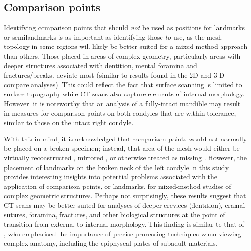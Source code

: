 \documentclass[review]{elsarticle}
\begin{document}
\subsection{Comparison points}

Identifying comparison points that should \textit{not} be used as positions for landmarks or semilandmarks is as important as identifying those \textit{to} use, as the mesh topology in some regions will likely be better suited for a mixed-method approach than others. Those placed in areas of complex geometry, particularly areas with deeper structures associated with dentition, mental foramina and fractures/breaks, deviate most (similar to results found in the 2D and 3-D compare analyses). This could reflect the fact that surface scanning is limited to surface topography while CT scans also capture elements of internal morphology. However, it is noteworthy that an analysis of a fully-intact mandible may result in measures for comparison points on both condyles that are within tolerance, similar to those on the intact right condyle.

With this in mind, it is acknowledged that comparison points would not normally be placed on a broken specimen; instead, that area of the mesh would either be virtually reconstructed \citep{RN11496,RN5889,Heid1,RN5903,RN5904}, mirrored \citep{RN11504}, or otherwise treated as missing \citep{RN11500,RN11497,RN11498,RN11499}. However, the placement of landmarks on the broken neck of the left condyle in this study provides interesting insights into potential problems associated with the application of comparison points, or landmarks, for mixed-method studies of complex geometric structures. Perhaps not surprisingly, these results suggest that CT-scans may be better-suited for analyses of deeper crevices (dentition), cranial sutures, foramina, fractures, and other biological structures at the point of transition from external to internal morphology. This finding is similar to that of \citet{RN8984}, who emphasised the importance of precise processing techniques when viewing complex anatomy, including the epiphyseal plates of subadult materials.
\end{document}
